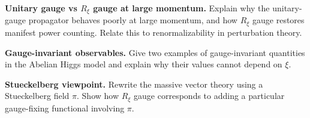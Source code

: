 \begin{problem}
    \textbf{Unitary gauge vs \(R_\xi\) gauge at large momentum.} Explain why the unitary-gauge propagator behaves poorly at large momentum, and how \(R_\xi\) gauge restores manifest power counting. Relate this to renormalizability in perturbation theory.
\end{problem}
\begin{problem}
    \textbf{Gauge-invariant observables.} Give two examples of gauge-invariant quantities in the Abelian Higgs model and explain why their values cannot depend on \(\xi\).
\end{problem}
\begin{problem}
    \textbf{Stueckelberg viewpoint.} Rewrite the massive vector theory using a Stueckelberg field \(\pi\). Show how \(R_\xi\) gauge corresponds to adding a particular gauge-fixing functional involving \(\pi\).
\end{problem}
